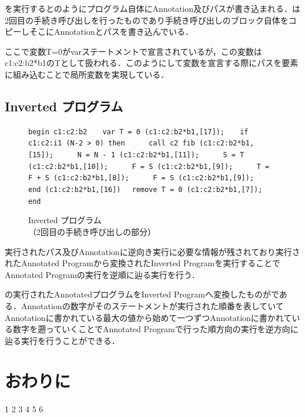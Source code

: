 \documentclass[submit,PRO]{ipsj}
\def\|{\verb|}
\begin{document}
を実行するとのようにプログラム自体にAnnotation及びパスが書き込まれる．は2回目の手続き呼び出しを行ったものであり手続き呼び出しのブロック自体をコピーしそこにAnnotationとパスを書き込んでいる．

ここで変数T=0がvarステートメントで宣言されているが，この変数はc1:c2:b2*b1のTとして扱われる．このようにして変数を宣言する際にパスを要素に組み込むことで局所変数を実現している．

\subsection{Inverted プログラム}
\begin{figure}[tb]
\vbox{
\hbox{\|begin c1:c2:b2|}
\hbox{\|   var T = 0 (c1:c2:b2*b1,[17]);|}
\hbox{\|   if c1:c2:i1 (N-2 > 0) then|}
\hbox{\|     call c2 fib (c1:c2:b2*b1,[15]);|}
\hbox{\|     N = N - 1 (c1:c2:b2*b1,[11]);|}
\hbox{\|     S = T (c1:c2:b2*b1,[10]);|}
\hbox{\|     F = S (c1:c2:b2*b1,[9]);|}
\hbox{\|     T = F + S (c1:c2:b2*b1,[8]);|}
\hbox{\|     F = S (c1:c2:b2*b1,[9]);|}
\hbox{\|  end (c1:c2:b2*b1,[16])|}
\hbox{\|  remove T = 0 (c1:c2:b2*b1,[7]);|}
\hbox{\|end|}
}
\centerline{}
\caption{Inverted プログラム\\
（2回目の手続き呼び出しの部分）}
\label{fig:Hinvprogram}
\end{figure}


実行されたパス及びAnnotationに逆向き実行に必要な情報が残されており実行されたAnnotated Programから変換されたInverted Programを実行することでAnnotated Programの実行を逆順に辿る実行を行う．


の実行されたAnnotatedプログラムをInverted Programへ変換したものがである．Annotationの数字がそのステートメントが実行された順番を表していてAnnotationに書かれている最大の値から始めて一つずつAnnotationに書かれている数字を遡っていくことでAnnotated Programで行った順方向の実行を逆方向に辿る実行を行うことができる．


\section{おわりに}


\begin{thebibliography}{10}
 1
 2
 3
 4
 5
 6
\end{thebibliography}
\end{document}

